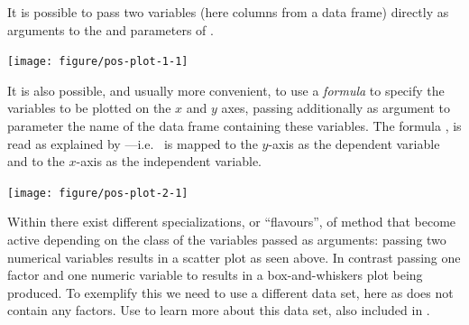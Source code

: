 \documentclass[krantz2]{krantz}\usepackage{knitr}%
\begin{document}
It is possible to pass two variables (here columns from a data frame) directly as arguments to the  and  parameters of .



\begin{knitrout}\footnotesize
{}\color{fgcolor}\begin{kframe}
\begin{alltt}
\hlstd{(} \hlopt{$}  \hlopt{$}
\end{alltt}
\end{kframe}

{\centering \texttt{[image: figure/pos-plot-1-1]} 

}



\end{knitrout}

It is also possible, and usually more convenient, to use a \emph{formula} to specify the variables to be plotted on the $x$ and $y$ axes, passing additionally as argument to  parameter  the name of the data frame containing these variables. The formula , is read as  explained by ---i.e.\  is mapped to the $y$-axis as the dependent variable and  to the $x$-axis as the independent variable.

\begin{knitrout}\footnotesize
{}\color{fgcolor}\begin{kframe}
\begin{alltt}
 \hlopt{~}   
\end{alltt}
\end{kframe}

{\centering \texttt{[image: figure/pos-plot-2-1]} 

}



\end{knitrout}

Within \Rlang there exist different specializations, or ``flavours'', of method  that become active depending on the class of the variables passed as arguments: passing two numerical variables results in a scatter plot as seen above. In contrast passing one factor and one numeric variable to  results in a box-and-whiskers plot being produced. To exemplify this we need to use a different data set, here  as  does not contain any factors. Use  to learn more about this data set, also included in \Rpgrm .
\end{document}

